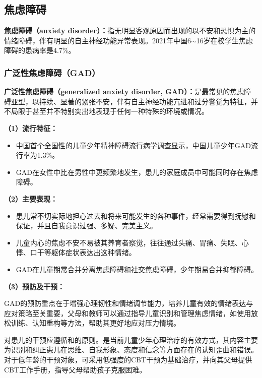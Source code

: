 \subsection{焦虑障碍}

\begin{defbox}
\textbf{焦虑障碍（anxiety disorder）：}指无明显客观原因而出现的以不安和恐惧为主的情绪障碍，伴有明显的自主神经功能异常表现。2021年中国6$\sim$16岁在校学生焦虑障碍的患病率是4.7\%。
\end{defbox}

\subsubsection{广泛性焦虑障碍（GAD）}

\begin{keybox}
\textbf{广泛性焦虑障碍（generalized anxiety disorder, GAD）：}是最常见的焦虑障碍亚型，以持续、显著的紧张不安，伴有自主神经功能亢进和过分警觉为特征，并不局限于甚至并不特别突出地表现于任何一种特殊的环境或情况。

\vspace{4pt}
\textbf{（1）流行特征：}

\begin{itemize}[leftmargin=*]
    \item 中国首个全国性的儿童少年精神障碍流行病学调查显示，中国儿童少年GAD流行率为1.3\%。
    \item GAD在女性中比在男性中更频繁地发生，患儿的家庭成员中可能同时存在焦虑障碍。
\end{itemize}

\vspace{4pt}
\textbf{（2）主要表现：}

\begin{itemize}[leftmargin=*]
    \item 患儿常不切实际地担心过去和将来可能发生的各种事件，经常需要得到抚慰和保证，并且自我意识过强、多疑、完美主义。
    \item 儿童内心的焦虑不安不易被其养育者察觉，往往通过头痛、胃痛、失眠、心悸、口干等躯体症状表达出这种情绪。
    \item GAD在儿童期常合并分离焦虑障碍和社交焦虑障碍，少年期易合并抑郁障碍。
\end{itemize}

\vspace{4pt}
\textbf{（3）预防及干预：}

GAD的预防重点在于增强心理韧性和情绪调节能力，培养儿童有效的情绪表达与应对策略至关重要，父母和教师可以通过指导儿童识别和管理焦虑情绪，如使用放松训练、认知重构等方法，帮助其更好地应对压力情境。

对患儿的干预应遵循和的原则。是当前儿童少年心理治疗的有效方式，其内容主要为识别和纠正患儿在思维、自我形象、态度和信念等方面存在的认知歪曲和错误。对于低年龄的干预对象，可采用低强度的CBT干预为基础治疗，并向其父母提供CBT工作手册，指导父母帮助孩子克服困难。
\end{keybox}

